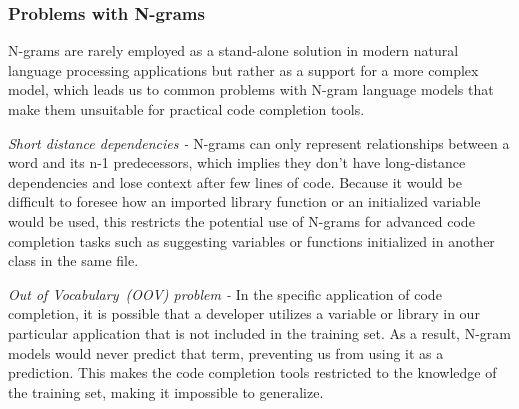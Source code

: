 \subsubsection{Problems with N-grams}
N-grams are rarely employed as a stand-alone solution in modern natural language processing applications but rather as a support for a more complex model, which leads us to common problems with N-gram language models that make them unsuitable for practical code completion tools.

\emph{Short distance dependencies -} N-grams can only represent relationships between a word and its n-1 predecessors, which implies they don't have long-distance dependencies and lose context after few lines of code.
Because it would be difficult to foresee how an imported library function or an initialized variable would be used, this restricts the potential use of N-grams for advanced code completion tasks such as suggesting variables or functions initialized in another class in the same file.

\emph{Out of Vocabulary~(OOV) problem - } In the specific application of code completion, it is possible that a developer utilizes a variable or library in our particular application that is not included in the training set. 
As a result, N-gram models would never predict that term, preventing us from using it as a prediction. This makes the code completion tools restricted to the knowledge of the training set, making it impossible to generalize.

